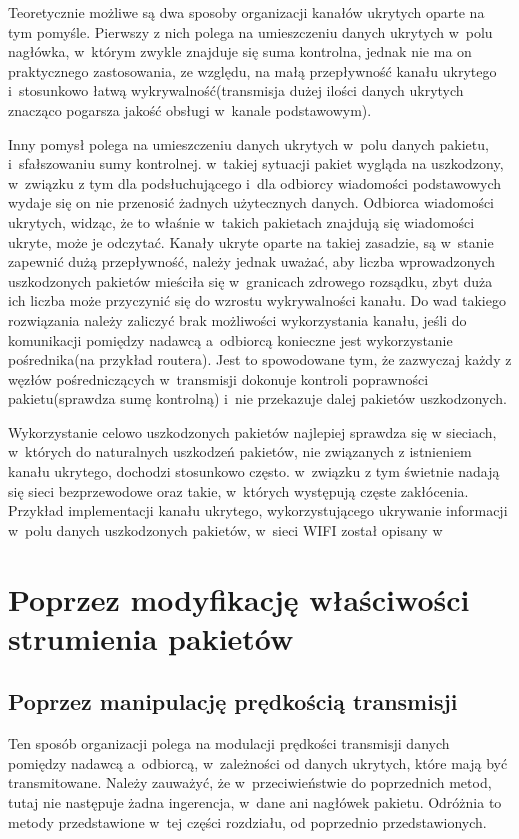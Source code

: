 \documentclass[a4paper, twoside, 12pt]{report}
\begin{document}
        Teoretycznie możliwe są dwa
        sposoby organizacji kanałów ukrytych oparte na tym pomyśle. Pierwszy z nich polega na umieszczeniu
        danych ukrytych w~polu nagłówka, w~którym zwykle znajduje się suma kontrolna,
        jednak nie ma on praktycznego zastosowania, ze względu, na małą przepływność
        kanału ukrytego i~stosunkowo łatwą wykrywalność(transmisja dużej ilości
        danych ukrytych znacząco pogarsza jakość obsługi w~kanale podstawowym).

        Inny pomysł polega
        na umieszczeniu danych ukrytych w~polu danych pakietu, i~sfałszowaniu sumy
        kontrolnej. w~takiej sytuacji pakiet wygląda na uszkodzony, w~związku z tym
        dla podsłuchującego i~dla odbiorcy wiadomości podstawowych wydaje się
        on nie przenosić żadnych użytecznych danych. Odbiorca wiadomości ukrytych,
        widząc, że to właśnie w~takich pakietach znajdują się wiadomości ukryte,
        może je odczytać. Kanały ukryte oparte na takiej zasadzie, są w~stanie
        zapewnić dużą przepływność, należy jednak uważać, aby liczba wprowadzonych
        uszkodzonych pakietów mieściła się w~granicach zdrowego rozsądku, zbyt duża
        ich liczba może przyczynić się do wzrostu wykrywalności kanału. Do wad takiego
        rozwiązania należy zaliczyć brak możliwości wykorzystania kanału, jeśli do
        komunikacji pomiędzy nadawcą a~odbiorcą konieczne jest wykorzystanie pośrednika(na przykład routera).
        Jest to spowodowane tym, że zazwyczaj każdy z węzłów pośredniczących w~transmisji
        dokonuje kontroli poprawności pakietu(sprawdza sumę kontrolną) i~nie przekazuje
        dalej pakietów uszkodzonych.

        Wykorzystanie celowo uszkodzonych pakietów najlepiej sprawdza się w
        sieciach, w~których do naturalnych uszkodzeń pakietów, nie związanych z
        istnieniem kanału ukrytego, dochodzi stosunkowo często. w~związku z tym
        świetnie nadają się sieci bezprzewodowe oraz takie, w~których występują
        częste zakłócenia. Przykład implementacji kanału ukrytego, wykorzystującego
        ukrywanie informacji w~polu danych uszkodzonych pakietów, w~sieci WIFI
        został opisany w~\cite{HICCUPS}

    \section{Poprzez modyfikację właściwości strumienia pakietów} \label{MODYFIKACJASTRUMIENIA}
        \subsection{Poprzez manipulację prędkością transmisji}
        Ten sposób organizacji polega na modulacji prędkości transmisji danych
        pomiędzy nadawcą a~odbiorcą, w~zależności od danych ukrytych, które mają
        być transmitowane. Należy zauważyć, że w~przeciwieństwie do poprzednich
        metod, tutaj nie następuje żadna ingerencja, w~dane ani nagłówek pakietu.
        Odróżnia to metody przedstawione w~tej części rozdziału, od poprzednio
        przedstawionych.
\end{document}
